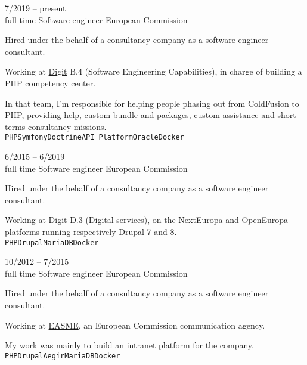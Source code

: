 \begin{entrylist}
	\entry
		{7/2019 -- present\\\footnotesize{full time}}
		{Software engineer}
        {European Commission}
        {
			Hired under the behalf of a consultancy company as a software engineer consultant.

			Working at \href{https://ec.europa.eu/info/departments/informatics_en}{Digit} B.4 (Software Engineering Capabilities),
			in charge of building a PHP competency center.

			In that team, I'm responsible for helping people phasing out from ColdFusion to PHP, providing help,
			custom bundle and packages, custom assistance and short-terms consultancy missions.
			\\ \texttt{PHP}\slashsep\texttt{Symfony}\slashsep\texttt{Doctrine}\slashsep\texttt{API Platform}\slashsep\texttt{Oracle}\slashsep\texttt{Docker}
        }
	\entry
		{6/2015 -- 6/2019\\\footnotesize{full time}}
		{Software engineer}
        {European Commission}
        {
			Hired under the behalf of a consultancy company as a software engineer consultant.

			Working at \href{https://ec.europa.eu/info/departments/informatics_en}{Digit} D.3 (Digital services),
			on the NextEuropa and OpenEuropa platforms running respectively Drupal 7 and 8.
			\\ \texttt{PHP}\slashsep\texttt{Drupal}\slashsep\texttt{MariaDB}\slashsep\texttt{Docker}
        }
	\entry
		{10/2012 -- 7/2015\\\footnotesize{full time}}
		{Software engineer}
        {European Commission}
        {
			Hired under the behalf of a consultancy company as a software engineer consultant.

			Working at \href{https://ec.europa.eu/easme/}{EASME}, an European Commission communication agency.

			My work was mainly to build an intranet platform for the company.
			\\ \texttt{PHP}\slashsep\texttt{Drupal}\slashsep\texttt{Aegir}\slashsep\texttt{MariaDB}\slashsep\texttt{Docker}
        }
\end{entrylist}




